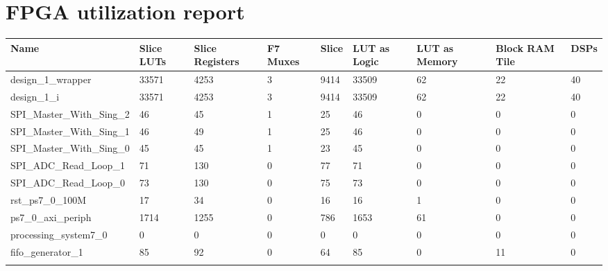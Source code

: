 \chapter[Appendix: b]{FPGA utilization report}\label{a:FPGA}

\begin{landscape}
\tiny
\begin{longtable}{@{}|l|l|l|l|l|l|l|l|l|@{}}
\toprule
\textbf{Name} & \textbf{Slice LUTs} & \textbf{Slice Registers} & \textbf{F7 Muxes} & \textbf{Slice} & \textbf{LUT as Logic} & \textbf{LUT as Memory} & \textbf{Block RAM Tile} & \textbf{DSPs} \\* \midrule
\endhead
%
\rowcolor[HTML]{FFFFFF} 
design\_1\_wrapper & 33571 & 4253 & 3 & 9414 & 33509 & 62 & 22 & 40 \\* \midrule
\rowcolor[HTML]{FFFFFF} 
design\_1\_i & 33571 & 4253 & 3 & 9414 & 33509 & 62 & 22 & 40 \\* \midrule
\rowcolor[HTML]{FFFFFF} 
SPI\_Master\_With\_Sing\_2 & 46 & 45 & 1 & 25 & 46 & 0 & 0 & 0 \\* \midrule
\rowcolor[HTML]{FFFFFF} 
SPI\_Master\_With\_Sing\_1 & 46 & 49 & 1 & 25 & 46 & 0 & 0 & 0 \\* \midrule
\rowcolor[HTML]{FFFFFF} 
SPI\_Master\_With\_Sing\_0 & 45 & 45 & 1 & 23 & 45 & 0 & 0 & 0 \\* \midrule
\rowcolor[HTML]{FFFFFF} 
SPI\_ADC\_Read\_Loop\_1 & 71 & 130 & 0 & 77 & 71 & 0 & 0 & 0 \\* \midrule
\rowcolor[HTML]{FFFFFF} 
SPI\_ADC\_Read\_Loop\_0 & 73 & 130 & 0 & 75 & 73 & 0 & 0 & 0 \\* \midrule
\rowcolor[HTML]{FFFFFF} 
rst\_ps7\_0\_100M & 17 & 34 & 0 & 16 & 16 & 1 & 0 & 0 \\* \midrule
\rowcolor[HTML]{FFFFFF} 
ps7\_0\_axi\_periph & 1714 & 1255 & 0 & 786 & 1653 & 61 & 0 & 0 \\* \midrule
\rowcolor[HTML]{FFFFFF} 
processing\_system7\_0 & 0 & 0 & 0 & 0 & 0 & 0 & 0 & 0 \\* \midrule
\rowcolor[HTML]{FFFFFF} 
fifo\_generator\_1 & 85 & 92 & 0 & 64 & 85 & 0 & 11 & 0 \\* \midrule
\rowcolor[HTML]{FFFFFF} 

\end{longtable}
\end{landscape}
